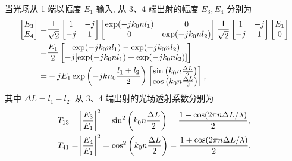 \documentclass{assignment}
\begin{document}
\begin{sol}
    当光场从 1 端以幅度 $E_1$ 输入, 从 3、4 端出射的幅度 $E_3,E_4$ 分别为
    \begin{align}
        \notag\begin{bmatrix}
            E_3\\
            E_4
        \end{bmatrix}=&\frac{1}{\sqrt{2}}\begin{bmatrix}
            1&-j\\
            -j&1
        \end{bmatrix}\begin{bmatrix}
            \exp(-jk_0nl_1)&0\\
            0&\exp(-jk_0nl_2)
        \end{bmatrix}\frac{1}{\sqrt{2}}\begin{bmatrix}
            1&-j\\
            -j&1
        \end{bmatrix}\begin{bmatrix}
            E_1\\
            0
        \end{bmatrix}\\
        \notag=&\frac{E_1}{2}\begin{bmatrix}
            \exp(-jk_0nl_1)-\exp(-jk_0nl_2)\\
            -j[\exp(-jk_0nl_1)+\exp(-jk_0nl_2)]
        \end{bmatrix}\\
        =&-jE_1\exp\left(-jkn_0\frac{l_1+l_2}{2}\right)\begin{bmatrix}
            \sin\left(k_0n\frac{\Delta L}{2}\right)\\
            \cos\left(k_0n\frac{\Delta L}{2}\right)
        \end{bmatrix},
    \end{align}
    其中 $\Delta L=l_1-l_2$.
    从 3、4 端出射的光场透射系数分别为
    \begin{align}
        T_{13}=&\left\lvert\frac{E_3}{E_1}\right\rvert^2=\sin^2\left(k_0n\frac{\Delta L}{2}\right)=\frac{1-\cos(2\pi n\Delta L/\lambda)}{2},\\
        T_{41}=&\left\lvert\frac{E_4}{E_1}\right\rvert^2=\cos^2\left(k_0n\frac{\Delta L}{2}\right)=\frac{1+\cos(2\pi n\Delta L/\lambda)}{2}.
    \end{align}


\end{sol}
\end{document}
